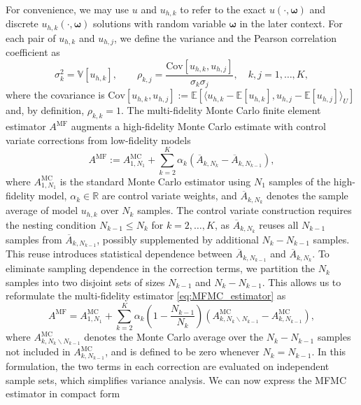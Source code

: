 For convenience, we may use $u$ and $u_{h,k}$ to refer to the exact $u(\cdot,\boldsymbol \omega)$ and discrete $u_{h,k}(\cdot,\boldsymbol \omega)$ solutions with random variable $\boldsymbol \omega$ in the later context. For each pair of $u_{h,k}$ and $u_{h,j}$, we define the variance and the Pearson correlation coefficient as
%
\begin{equation*}
    \sigma_k^2 = \mathbb{V}\left[u_{h,k}\right],\qquad \rho_{k,j} = \frac{\text{Cov}\left[ u_{h,k}, u_{h,j}\right]}{\sigma_k\sigma_j}, \quad k,j=1,\dots, K,
\end{equation*}
%
where the covariance is $\text{Cov}[u_{h,k}, u_{h,j}] := \mathbb{E}[\langle u_{h,k} - \mathbb{E}[u_{h,k}], u_{h,j} - \mathbb{E}[u_{h,j}]\rangle_U]$ and, by definition, $\rho_{k,k}=1$. The multi-fidelity Monte Carlo finite element estimator $A^{\text{MF}}$ augments a high-fidelity Monte Carlo estimate with control variate corrections from low-fidelity models
%
\begin{equation}\label{eq:MFMC_estimator}
    A^{\text{MF}} := A^{\text{MC}}_{1,N_1} + \sum_{k=2}^K \alpha_k\left(\overline{A}_{k,N_k} - \overline{A}_{k,N_{k-1}} \right),
\end{equation}
%
where $A^{\text{MC}}_{1,N_1}$ is the standard Monte Carlo estimator using $N_1$ samples of the high-fidelity model, $\alpha_k\in \mathbb{R}$ are control variate weights, and $\overline{A}_{k,N_k}$ denotes the sample average of model $u_{h,k}$ over $N_k$ samples. The control variate construction requires the nesting condition $N_{k-1}\le N_k$ for $k=2,\ldots, K$, as $\overline{A}_{k,N_{k}}$ reuses all $N_{k-1}$ samples from $\overline{A}_{k,N_{k-1}}$, possibly supplemented by additional $N_{k} - N_{k-1}$ samples. This reuse introduces statistical dependence between $\overline{A}_{k,N_{k-1}}$ and $\overline{A}_{k,N_{k}}$. To eliminate sampling dependence in the correction terms, we partition the $N_k$ samples into two disjoint sets of sizes  $N_{k-1}$ and $N_k - N_{k-1}$. This allows us to reformulate the multi-fidelity estimator \eqref{eq:MFMC_estimator} as
%
\begin{equation}\label{eq:MFMC_estimator_independent}
    A^{\text{MF}} = A^{\text{MC}}_{1,N_1} +  \sum_{k=2}^K \alpha_k\left(1-\frac{N_{k-1}}{N_{k}}\right)\left(A_{k,N_k\backslash N_{k-1}}^{\text{MC}}-A_{k,N_{k-1}}^{\text{MC}}\right),
\end{equation}
%
where $A^{\text{MC}}_{k,N_k \backslash N_{k-1}}$ denotes the Monte Carlo average over the $N_k - N_{k-1}$ samples not included in $A^{\text{MC}}_{k,N_{k-1}}$, and is defined to be zero whenever $N_k=N_{k-1}$. In this formulation, the two terms in each correction are evaluated on independent sample sets, which simplifies variance analysis. We can now express the MFMC estimator in compact form
